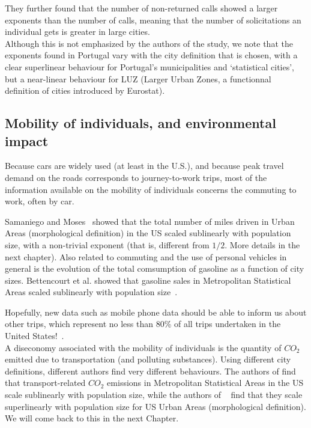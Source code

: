 They further found that the number of non-returned calls showed a larger
exponents than the number of calls, meaning that the number of solicitations an
individual gets is greater in large cities.\\

Although this is not emphasized by the authors of the study, we note that the
exponents found in Portugal vary with the city definition that is chosen, with a
clear superlinear behaviour for Portugal's municipalities and `statistical
cities', but a near-linear behaviour for LUZ (Larger Urban Zones, a functionnal
definition of cities introduced by Eurostat).


\subsection{Mobility of individuals, and environmental impact}
\label{sub:mobility}

Because cars are widely used (at least in the U.S.), and because peak travel
demand on the roads corresponds to journey-to-work trips, most of the
information available on the mobility of individuals concerns the commuting to
work, often by car. 

Samaniego and Moses~\cite{Samaniego:2008} showed that the total number of miles
driven in Urban Areas (morphological definition) in the US scaled sublinearly
with population size, with a non-trivial exponent (that is, different from
$1/2$. More details in the next chapter).  Also related to commuting and the use of
personal vehicles in general is the evolution of the total comsumption of
gasoline as a function of city sizes. Bettencourt et al. showed that gasoline
sales in Metropolitan Statistical Areas scaled sublinearly with population
size~\cite{Bettencourt:2007}. 

Hopefully, new data such as mobile phone data should be
able to inform us about other trips, which represent no less than 80\% of all
trips undertaken in the United States!~\cite{FHWA-PL-11-022}.\\

A diseconomy associated with the mobility of individuals is the
quantity of $CO_2$ emitted due to transportation (and polluting substances).
Using different city definitions, different authors find very different
behaviours. The authors of \cite{Fragkias:2013} find that transport-related
$CO_2$ emissions in Metropolitan Statistical Areas in the US scale sublinearly
with population size, while the authors of
~\cite{Louf:2014_mobility,Oliveira:2014} find that they scale superlinearly with
population size for US Urban Areas (morphological definition). We will come back
to this in the next Chapter.


